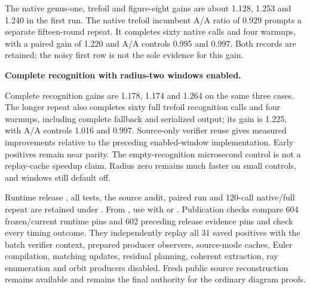 The native genus-one, trefoil and figure-eight gains are about 1.128,
1.253 and 1.240 in the first run. The native trefoil incumbent A/A ratio
of 0.929 prompts a separate fifteen-round repeat. It completes sixty native
calls and four warmups, with a paired gain of 1.220 and A/A controls 0.995
and 0.997. Both records are retained; the noisy first row is not the sole
evidence for this gain.

\begin{samepage}
\noindent\textbf{Complete recognition with radius-two windows enabled.}

\end{samepage}

Complete recognition gains are 1.178, 1.174 and 1.264 on the same three
cases. The longer repeat also completes sixty full trefoil recognition
calls and four warmups, including complete fallback and serialized output;
its gain is 1.225, with A/A controls 1.016 and 0.997. Source-only verifier
reuse gives measured improvements relative to the preceding enabled-window
implementation. Early positives remain near parity. The empty-recognition
microsecond control is not a replay-cache speedup claim. Radius zero remains
much faster on small controls, and windows still default off.

\begin{sloppypar}
Runtime release , all tests, the source audit, paired run
and 120-call native/full repeat are retained under .
From , use  with
 or .
Publication checks compare 604 frozen/current runtime pins and 602 preceding
release evidence pins and check every timing outcome. They independently
replay all 31 saved positives with the batch verifier context, prepared
producer observers, source-mode caches, Euler compilation, matching updates,
residual planning, coherent extraction, ray enumeration and orbit producers
disabled. Fresh public source reconstruction remains available and remains
the final authority for the ordinary diagram proofs.
\end{sloppypar}
